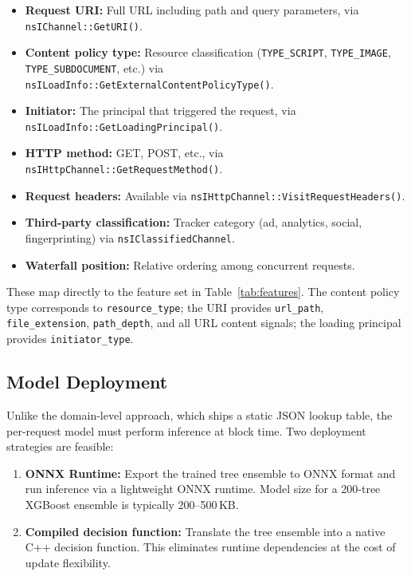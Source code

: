 \documentclass[11pt]{article}
\begin{document}
\begin{itemize}
    \item \textbf{Request URI:} Full URL including path and query parameters, via \texttt{nsIChannel::GetURI()}.
    \item \textbf{Content policy type:} Resource classification (\texttt{TYPE\_SCRIPT}, \texttt{TYPE\_IMAGE}, \texttt{TYPE\_SUBDOCUMENT}, etc.) via \texttt{nsILoadInfo::GetExternalContentPolicyType()}.
    \item \textbf{Initiator:} The principal that triggered the request, via \texttt{nsILoadInfo::GetLoadingPrincipal()}.
    \item \textbf{HTTP method:} GET, POST, etc., via \texttt{nsIHttpChannel::GetRequestMethod()}.
    \item \textbf{Request headers:} Available via \texttt{nsIHttpChannel::VisitRequestHeaders()}.
    \item \textbf{Third-party classification:} Tracker category (ad, analytics, social, fingerprinting) via \texttt{nsIClassifiedChannel}.
    \item \textbf{Waterfall position:} Relative ordering among concurrent requests.
\end{itemize}

These map directly to the feature set in Table~\ref{tab:features}. The content policy type corresponds to \texttt{resource\_type}; the URI provides \texttt{url\_path}, \texttt{file\_extension}, \texttt{path\_depth}, and all URL content signals; the loading principal provides \texttt{initiator\_type}.

\subsection{Model Deployment}

Unlike the domain-level approach, which ships a static JSON lookup table, the per-request model must perform inference at block time. Two deployment strategies are feasible:

\begin{enumerate}
    \item \textbf{ONNX Runtime:} Export the trained tree ensemble to ONNX format and run inference via a lightweight ONNX runtime. Model size for a 200-tree XGBoost ensemble is typically 200--500\,KB.
    \item \textbf{Compiled decision function:} Translate the tree ensemble into a native C++ decision function. This eliminates runtime dependencies at the cost of update flexibility.
\end{enumerate}
\end{document}
